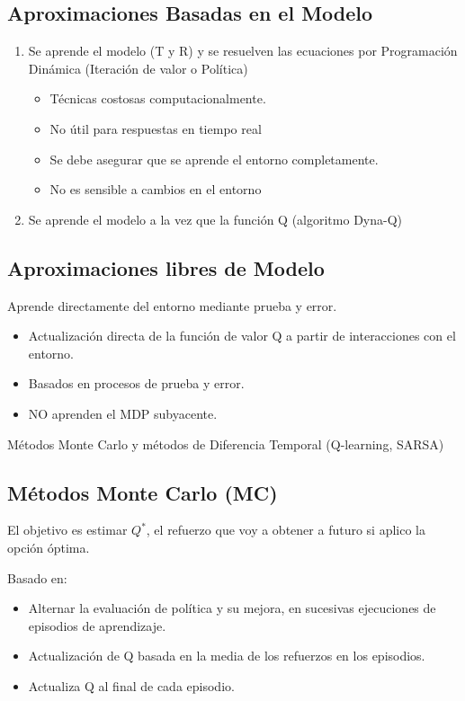 \documentclass[12pt, twoside, openright]{report} %
\begin{document}
\subsection{Aproximaciones Basadas en el Modelo}
\begin{enumerate}
	\item Se aprende el modelo (T y R) y se resuelven las ecuaciones por Programación Dinámica (Iteración de valor o Política)
	      \begin{itemize}
		      \item Técnicas costosas computacionalmente.
		      \item No útil para respuestas en tiempo real
		      \item Se debe asegurar que se aprende el entorno completamente.
		      \item No es sensible a cambios en el entorno
	      \end{itemize}
	\item Se aprende el modelo a la vez que la función Q (algoritmo Dyna-Q)
\end{enumerate}

\subsection{Aproximaciones libres de Modelo}
Aprende directamente del entorno mediante prueba y error.
\begin{itemize}
	\item Actualización directa de la función de valor Q a partir de interacciones con el entorno.
	\item Basados en procesos de prueba y error.
	\item NO aprenden el MDP subyacente.
\end{itemize}
Métodos Monte Carlo y métodos de Diferencia Temporal (Q-learning, SARSA)

\subsection{Métodos Monte Carlo (MC)}
El objetivo es estimar $Q^*$, el refuerzo que voy a obtener a futuro si aplico la opción óptima.

Basado en:
\begin{itemize}
	\item Alternar la evaluación de política y su mejora, en sucesivas ejecuciones de episodios de aprendizaje.
	\item Actualización de Q basada en la media de los refuerzos en los episodios.
	\item Actualiza Q al final de cada episodio.
\end{itemize}
\end{document}
